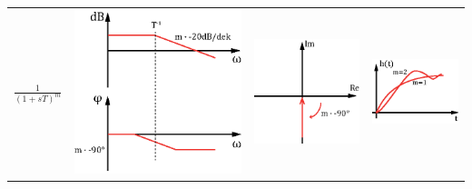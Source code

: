 \begin{tabular}{>{\centering\arraybackslash}p{1.5cm}|>{\centering\arraybackslash}p{2.5cm}|>{\centering\arraybackslash}p{2cm}|>{\centering\arraybackslash}p{2.5cm}}
\hline \rule[-2ex]{0pt}{5.5ex} $\frac{1}{(1+sT)^m}$ & \includegraphics[scale = 0.3]{../fig/bode_1stm.eps} & \includegraphics[scale = 0.4]{../fig/ort_1stm.eps} & \includegraphics[scale = 0.5]{../fig/spr_1stm.eps} \\ 

\end{tabular}
